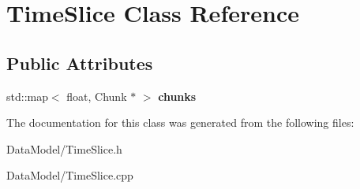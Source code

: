 \hypertarget{classTimeSlice}{\section{Time\-Slice Class Reference}
\label{classTimeSlice}
}
\subsection*{Public Attributes}
\begin{DoxyCompactItemize}
\item 
\hypertarget{classTimeSlice_a34d0d4188fa5ad2416c2899f90e2e8da}{std\-::map$<$ float, Chunk $\ast$ $>$ {\bfseries chunks}}\label{classTimeSlice_a34d0d4188fa5ad2416c2899f90e2e8da}

\end{DoxyCompactItemize}


The documentation for this class was generated from the following files\-:\begin{DoxyCompactItemize}
\item 
Data\-Model/Time\-Slice.\-h\item 
Data\-Model/Time\-Slice.\-cpp\end{DoxyCompactItemize}
